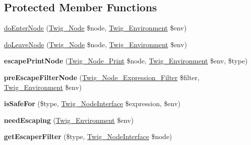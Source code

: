 \subsection*{Protected Member Functions}
\begin{DoxyCompactItemize}
\item 
\hyperlink{classTwig__NodeVisitor__Escaper_a4a0be878452b95aa5f6a81b9dce441b5}{do\+Enter\+Node} (\hyperlink{classTwig__Node}{Twig\+\_\+\+Node} \$node, \hyperlink{classTwig__Environment}{Twig\+\_\+\+Environment} \$env)
\item 
\hyperlink{classTwig__NodeVisitor__Escaper_a77b13ffa5303eb5ae7cf2820ccbf3a78}{do\+Leave\+Node} (\hyperlink{classTwig__Node}{Twig\+\_\+\+Node} \$node, \hyperlink{classTwig__Environment}{Twig\+\_\+\+Environment} \$env)
\item 
{\bfseries escape\+Print\+Node} (\hyperlink{classTwig__Node__Print}{Twig\+\_\+\+Node\+\_\+\+Print} \$node, \hyperlink{classTwig__Environment}{Twig\+\_\+\+Environment} \$env, \$type)\hypertarget{classTwig__NodeVisitor__Escaper_a075ebf6ad2f64acd20857ee649835f2f}{}\label{classTwig__NodeVisitor__Escaper_a075ebf6ad2f64acd20857ee649835f2f}

\item 
{\bfseries pre\+Escape\+Filter\+Node} (\hyperlink{classTwig__Node__Expression__Filter}{Twig\+\_\+\+Node\+\_\+\+Expression\+\_\+\+Filter} \$filter, \hyperlink{classTwig__Environment}{Twig\+\_\+\+Environment} \$env)\hypertarget{classTwig__NodeVisitor__Escaper_a40cededc8897e9b4736c2f1de337b8c6}{}\label{classTwig__NodeVisitor__Escaper_a40cededc8897e9b4736c2f1de337b8c6}

\item 
{\bfseries is\+Safe\+For} (\$type, \hyperlink{interfaceTwig__NodeInterface}{Twig\+\_\+\+Node\+Interface} \$expression, \$env)\hypertarget{classTwig__NodeVisitor__Escaper_a0674e1ee5233ab29a8e91dc855d2fd20}{}\label{classTwig__NodeVisitor__Escaper_a0674e1ee5233ab29a8e91dc855d2fd20}

\item 
{\bfseries need\+Escaping} (\hyperlink{classTwig__Environment}{Twig\+\_\+\+Environment} \$env)\hypertarget{classTwig__NodeVisitor__Escaper_ac028b95d382a56ae6c5074f61aa7ec48}{}\label{classTwig__NodeVisitor__Escaper_ac028b95d382a56ae6c5074f61aa7ec48}

\item 
{\bfseries get\+Escaper\+Filter} (\$type, \hyperlink{interfaceTwig__NodeInterface}{Twig\+\_\+\+Node\+Interface} \$node)\hypertarget{classTwig__NodeVisitor__Escaper_a814fa6106df8fd5baf1798b6aa460202}{}\label{classTwig__NodeVisitor__Escaper_a814fa6106df8fd5baf1798b6aa460202}

\end{DoxyCompactItemize}
